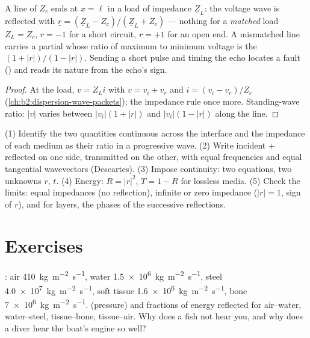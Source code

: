 \begin{proposition}\label{prop:b2:wave-interfaces:coax}
A line of  $Z_c$ ends at $x = \ell$ in a load of
impedance $\underline Z_L$: the voltage wave is reflected with $\underline r =
(\underline Z_L - Z_c)/(\underline Z_L + Z_c)$ --- nothing for a \emph{matched} load
$Z_L = Z_c$, $r = -1$ for a short circuit, $r = +1$ for an open end. A
mismatched line carries a partial  whose ratio of maximum
to minimum voltage is the \emph{} $(1 + |r|)/(1 - |r|)$.
Sending a short pulse and timing the echo locates a fault () and reads its nature from the echo's sign.
\end{proposition}

\begin{proof}
At the load, $v = Z_Li$ with $v = v_i + v_r$ and $i = (v_i - v_r)/Z_c$
(\cref{ch:b2:dispersion-wave-packets}); the impedance rule once more.
Standing-wave ratio: $|v|$ varies between $|v_i|(1 + |r|)$ and $|v_i|(1 -
|r|)$ along the line.
\end{proof}

\begin{method}\label{met:b2:wave-interfaces:method}
(1) Identify the two quantities continuous across the interface and
the impedance of each medium as their ratio in a progressive wave.
(2) Write incident $+$ reflected on one side, transmitted on the other,
with equal frequencies and equal tangential wavevectors (Descartes).
(3) Impose continuity: two equations, two unknowns $r$, $t$. (4) Energy:
$R = |r|^2$, $T = 1 - R$ for lossless media. (5) Check the limits: equal
impedances (no reflection), infinite or zero impedance ($|r| = 1$, sign
of $r$), and for layers, the phases of the successive reflections.
\end{method}

\section{Exercises}

\begin{exercise}[$\star$]\label{exo:b2:wave-interfaces:1}
: air \qty{410}{kg.m^{-2}.s^{-1}}, water \qty{1.5e6}{kg.m^{-2}.s^{-1}},
steel \qty{4.0e7}{kg.m^{-2}.s^{-1}}, soft tissue \qty{1.6e6}{kg.m^{-2}.s^{-1}}, bone
\qty{7e6}{kg.m^{-2}.s^{-1}}.  (pressure) and fractions
of energy reflected for air--water, water--steel, tissue--bone,
tissue--air. Why does a fish not hear you, and why does a diver hear
the boat's engine so well?
\end{exercise}

